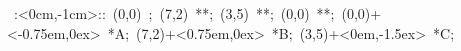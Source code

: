\hbox{
\xy    <1cm,0cm>:<0cm,-1cm>::
       (0,0) ; (7,2) **\dir{-};
       (3,5) **\dir{-}; (0,0)  **\dir{-};  
       (0,0)+<-0.75em,0ex> *{A};
       (7,2)+<0.75em,0ex> *{B};
       (3,5)+<0em,-1.5ex> *{C};
       \endxy}
	   
